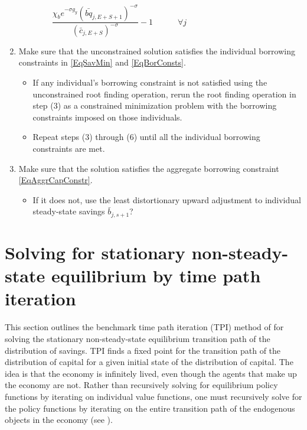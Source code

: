 \documentclass[letterpaper,12pt]{article}
\theoremstyle{definition}
\begin{document}
\begin{enumerate}
\begin{equation}
      \end{equation}
      \begin{equation}\label{EqSSeulerrBeq}
        \frac{\chi_b e^{-\sigma g_y}\left(\bar{bq}_{j,E+S+1}\right)^{-\sigma}}{\left(\bar{c}_{j,E+S}\right)^{-\sigma}} - 1 \quad\quad\quad\forall j\quad\quad\quad\quad\quad\quad\quad\quad\quad\quad
      \end{equation}
    \item Make sure that the unconstrained solution satisfies the individual borrowing constraints in \eqref{EqSavMin} and \eqref{EqBorConsts}.
      \begin{itemize}
        \item If any individual's borrowing constraint is not satisfied using the unconstrained root finding operation, rerun the root finding operation in step (3) as a constrained minimization problem with the borrowing constraints imposed on those individuals.
        \item Repeat steps (3) through (6) until all the individual borrowing constraints are met.
      \end{itemize}
    \item Make sure that the solution satisfies the aggregate borrowing constraint \eqref{EqAggrCapConstr}.
      \begin{itemize}
        \item If it does not, use the least distortionary upward adjustment to individual steady-state savings $\bar{b}_{j,s+1}$?
      \end{itemize}
  \end{enumerate}


\newpage
\section{Solving for stationary non-steady-state equilibrium by time path iteration}\label{AppNonSSsolve}

  \setcounter{equation}{0}

  This section outlines the benchmark time path iteration (TPI) method of \citet{AuerbachKotlikoff:1987} for solving the stationary non-steady-state equilibrium transition path of the distribution of savings. TPI finds a fixed point for the transition path of the distribution of capital for a given initial state of the distribution of capital. The idea is that the economy is infinitely lived, even though the agents that make up the economy are not. Rather than recursively solving for equilibrium policy functions by iterating on individual value functions, one must recursively solve for the policy functions by iterating on the entire transition path of the endogenous objects in the economy (see \citet[ch. 17]{StokeyLucas:1989}).
\end{document}
